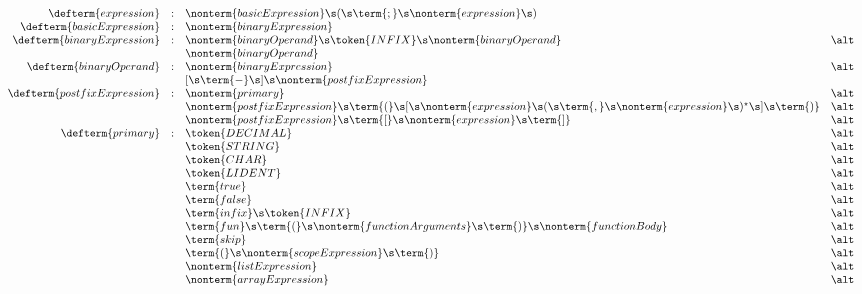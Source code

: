 \begin{figure}[h]
  \[
    \begin{array}{rcll}
      \defterm{expression}        & : & \nonterm{basicExpression}\s(\s\term{;}\s\nonterm{expression}\s)&\\
      \defterm{basicExpression}   & : & \nonterm{binaryExpression}&\\
      \defterm{binaryExpression}  & : & \nonterm{binaryOperand}\s\token{INFIX}\s\nonterm{binaryOperand}&\alt\\
                                  &   & \nonterm{binaryOperand}&\\
      \defterm{binaryOperand}     & : & \nonterm{binaryExpression}&\alt\\
                                  &   & [\s\term{-}\s]\s\nonterm{postfixExpression}&\\
      \defterm{postfixExpression} & : & \nonterm{primary}&\alt\\
                                  &   & \nonterm{postfixExpression}\s\term{(}\s[\s\nonterm{expression}\s(\s\term{,}\s\nonterm{expression}\s)^\star\s]\s\term{)}&\alt\\
                                  &   & \nonterm{postfixExpression}\s\term{[}\s\nonterm{expression}\s\term{]}&\alt\\
      \defterm{primary}           & : & \token{DECIMAL}&\alt\\
                                  &   & \token{STRING}&\alt\\
                                  &   & \token{CHAR}&\alt\\
                                  &   & \token{LIDENT}&\alt\\
                                  &   & \term{true}&\alt\\
                                  &   & \term{false}&\alt\\
                                  &   & \term{infix}\s\token{INFIX}&\alt\\
                                  &   & \term{fun}\s\term{(}\s\nonterm{functionArguments}\s\term{)}\s\nonterm{functionBody}&\alt\\
                                  &   & \term{skip}&\alt\\
                                  &   & \term{(}\s\nonterm{scopeExpression}\s\term{)}&\alt\\
                                  &   & \nonterm{listExpression}&\alt\\
                                  &   & \nonterm{arrayExpression}&\alt\\

\end{array}\]
\end{figure}
